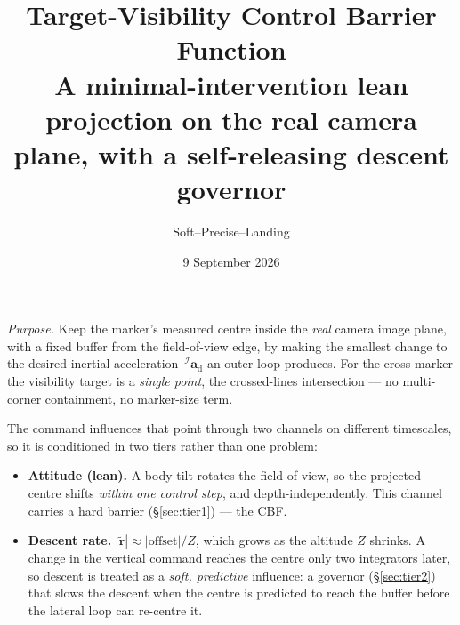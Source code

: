 \documentclass[11pt]{article}
\title{\textbf{Target-Visibility Control Barrier Function}\\[4pt]
\large A minimal-intervention lean projection on the real camera plane,
with a self-releasing descent governor}
\author{Soft--Precise--Landing}
\date{9 September 2026}
\newcommand{\Iframe}{\mathcal{I}}
\begin{document}
\maketitle

\noindent\emph{Purpose.} Keep the marker's measured centre inside the \emph{real} camera image plane,
with a fixed buffer from the field-of-view edge, by making the smallest change to the desired inertial
acceleration $\,^\Iframe\boldsymbol{a}_\text{d}$ an outer loop produces. For the cross marker the
visibility target is a \emph{single point}, the crossed-lines intersection --- no multi-corner
containment, no marker-size term.

The command influences that point through two channels on different timescales, so it is conditioned in
two tiers rather than one problem:
\begin{itemize}
\item \textbf{Attitude (lean).} A body tilt rotates the field of view, so the projected centre shifts
\emph{within one control step}, and depth-independently. This channel carries a hard barrier
(\S\ref{sec:tier1}) --- the CBF.
\item \textbf{Descent rate.} $|\tilde{\boldsymbol{r}}|\approx|\text{offset}|/Z$, which grows as the
altitude $Z$ shrinks. A change in the vertical command reaches the centre only two integrators later, so
descent is treated as a \emph{soft, predictive} influence: a governor (\S\ref{sec:tier2}) that slows the
descent when the centre is predicted to reach the buffer before the lateral loop can re-centre it.
\end{itemize}
\end{document}
